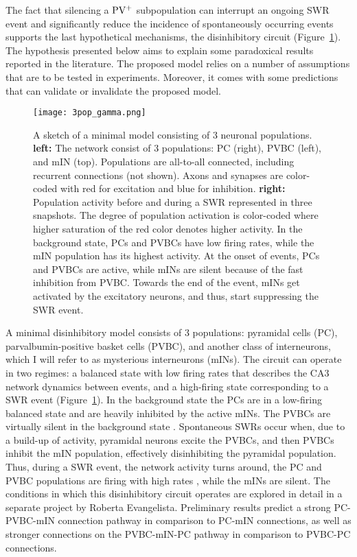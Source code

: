     The fact that silencing a $\rm PV^+$ subpopulation can interrupt an ongoing
    SWR event and significantly reduce the incidence of spontaneously occurring
    events \citep{Schlingloff2014} supports the last hypothetical mechanisms,
    the disinhibitory circuit (Figure~\ref{fig:3pop}). The hypothesis presented
    below aims to explain some paradoxical results reported in the literature.
    The proposed model relies on a number of assumptions that are to be tested
    in experiments. Moreover, it comes with some predictions that can validate
    or invalidate the proposed model.

    \begin{figure}
      \center
      \texttt{[image: 3pop\_gamma.png]}
      \caption{
        A sketch of a minimal model consisting of 3 neuronal populations.
        \textbf{left:} The network consist of 3 populations: PC
        (right), PVBC (left), and mIN (top). Populations are all-to-all
        connected, including recurrent connections (not shown). Axons and
        synapses are color-coded with red for excitation and blue for
        inhibition.
        \textbf{right:} Population activity before and during a SWR represented
        in three snapshots. The degree of population activation is color-coded
        where higher saturation of the red color denotes higher activity. In
        the background state, PCs and PVBCs have low firing rates, while the
        mIN population has its highest activity. At the onset of events, PCs
        and PVBCs are active, while mINs are silent because of the fast
        inhibition from PVBC. Towards the end of the event, mINs get activated
        by the excitatory neurons, and thus, start suppressing the SWR event.
             }
      \label{fig:3pop}
    \end{figure}
    
    A minimal disinhibitory model consists of 3 populations: pyramidal cells
    (PC), parvalbumin-positive basket cells (PVBC), and another class of
    interneurons, which I will refer to as mysterious interneurons (mINs). The
    circuit can operate in two regimes: a balanced state with low firing rates
    that describes the CA3 network dynamics between events, and a high-firing
    state corresponding to a SWR event (Figure~\ref{fig:3pop}). In the
    background state the PCs are in a low-firing \citep{Csicsvari1999} balanced
    state and are heavily inhibited by the active mINs. The PVBCs are virtually
    silent in the background state \citep{Klausberger2003, Varga2012}.
    Spontaneous SWRs occur when, due to a build-up of activity, pyramidal
    neurons excite the PVBCs, and then PVBCs inhibit the mIN population,
    effectively disinhibiting the pyramidal population. Thus, during a SWR
    event, the network activity turns around, the PC and PVBC populations are
    firing with high rates \citep{Klausberger2003, Varga2012}, while the mINs
    are silent. The conditions in which this disinhibitory circuit operates are
    explored in detail in a separate project by Roberta Evangelista.
    Preliminary results predict a strong PC-PVBC-mIN connection pathway in
    comparison to PC-mIN connections, as well as stronger connections on the
    PVBC-mIN-PC pathway in comparison to PVBC-PC connections.
    
